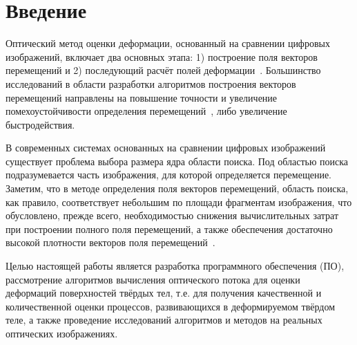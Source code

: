 \newpage
\section{Введение}



Оптический метод оценки деформации, основанный на сравнении цифровых изображений, включает два основных этапа: 1) построение поля векторов перемещений и 2) последующий расчёт полей деформации~\cite{pan_intro_one}. Большинство исследований в области разработки алгоритмов построения векторов перемещений направлены на повышение точности и увеличение помехоустойчивости определения перемещений~\cite{pan_intro_two, pan_intro_three}, либо увеличение быстродействия.

В современных системах основанных на сравнении цифровых изображений существует проблема выбора размера ядра области поиска. 
Под областью поиска подразумевается часть изображения, для которой определяется перемещение. 
Заметим, что в методе определения поля векторов перемещений, область поиска, как правило, соответствует небольшим по площади фрагментам изображения, что обусловлено, прежде всего, необходимостью снижения вычислительных затрат при построении полного поля перемещений, а также обеспечения достаточно высокой плотности векторов поля перемещений~\cite{tom_lyk, Lucas1981}.

Целью настоящей работы является разработка программного обеспечения (ПО), рассмотрение алгоритмов вычисления оптического потока для оценки деформаций поверхностей твёрдых тел, т.е. для получения качественной и количественной оценки процессов, развивающихся в деформируемом твёрдом теле, а также проведение исследований алгоритмов и методов на реальных оптических изображениях.
